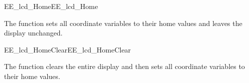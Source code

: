\begin{function_nopb2}{EE\_lcd\_Home}{EE_lcd_Home}
  
  \begin{fundescription}
    The function sets all coordinate variables to their home
    values and leaves the display unchanged.
  \end{fundescription}
  
  
  
\end{function_nopb2}

\begin{function_nopb2}{EE\_lcd\_HomeClear}{EE_lcd_HomeClear}
  
  \begin{fundescription}
    The function clears the entire display and then sets all
    coordinate variables to their home values.
  \end{fundescription}
  
  
  
\end{function_nopb2}

